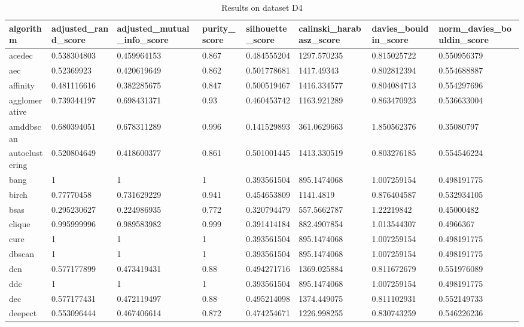 \begin{table}[H]
\centering
\caption{Results on dataset D4}
\label{S57_Table}
\begin{tabular}{|l|l|l|l|l|l|l|l|}
\hline
algorithm & adjusted\_rand\_score & adjusted\_mutual\_info\_score & purity\_score & silhouette\_score & calinski\_harabasz\_score & davies\_bouldin\_score & norm\_davies\_bouldin\_score \\
\hline
acedec & 0.538304803 & 0.459964153 & 0.867 & 0.484555204 & 1297.570235 & 0.815025722 & 0.550956379 \\
\hline
aec & 0.52369923 & 0.420619649 & 0.862 & 0.501778681 & 1417.49343 & 0.802812394 & 0.554688887 \\
\hline
affinity & 0.481116616 & 0.382285675 & 0.847 & 0.500519467 & 1416.334577 & 0.804084713 & 0.554297696 \\
\hline
agglomerative & 0.739344197 & 0.698431371 & 0.93 & 0.460453742 & 1163.921289 & 0.863470923 & 0.536633004 \\
\hline
amddbscan & 0.680394051 & 0.678311289 & 0.996 & 0.141529893 & 361.0629663 & 1.850562376 & 0.35080797 \\
\hline
autoclustering & 0.520804649 & 0.418600377 & 0.861 & 0.501001445 & 1413.330519 & 0.803276185 & 0.554546224 \\
\hline
bang & 1 & 1 & 1 & 0.393561504 & 895.1474068 & 1.007259154 & 0.498191775 \\
\hline
birch & 0.77770458 & 0.731629229 & 0.941 & 0.454653809 & 1141.4819 & 0.876404587 & 0.532934105 \\
\hline
bsas & 0.295230627 & 0.224986935 & 0.772 & 0.320794479 & 557.5662787 & 1.22219842 & 0.45000482 \\
\hline
clique & 0.995999996 & 0.989583982 & 0.999 & 0.391414184 & 882.4907854 & 1.013544307 & 0.4966367 \\
\hline
cure & 1 & 1 & 1 & 0.393561504 & 895.1474068 & 1.007259154 & 0.498191775 \\
\hline
dbscan & 1 & 1 & 1 & 0.393561504 & 895.1474068 & 1.007259154 & 0.498191775 \\
\hline
dcn & 0.577177899 & 0.473419431 & 0.88 & 0.494271716 & 1369.025884 & 0.811672679 & 0.551976089 \\
\hline
ddc & 1 & 1 & 1 & 0.393561504 & 895.1474068 & 1.007259154 & 0.498191775 \\
\hline
dec & 0.577177431 & 0.472119497 & 0.88 & 0.495214098 & 1374.449075 & 0.811102931 & 0.552149733 \\
\hline
deepect & 0.553096444 & 0.467406614 & 0.872 & 0.474254671 & 1226.998255 & 0.830743259 & 0.546226236 \\

\end{tabular}
\end{table}
